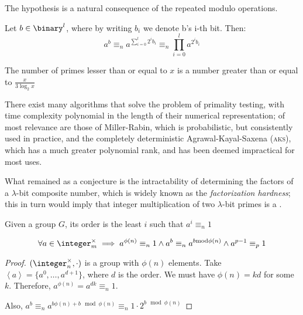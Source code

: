The hypothesis is a natural consequence of the repeated modulo operations.

\begin{observation}
    Let $b \in \binary^l$, where by writing $b_i$ we denote b's i-th bit. Then:
    \[
        a^b \equiv_n a^{\sum_{i = 0}^l 2^ib_i} \equiv_n \prod_{i = 0}^l a^{2^ib_i} 
    \]
\end{observation}

\begin{theorem}
    The number of primes lesser than or equal to $x$ is a number greater than or equal to $\frac{x}{3\log_2 x}$
\end{theorem}

There exist many algorithms that solve the problem of primality testing, with time complexity polynomial in the length of their numerical representation; of most relevance are those of Miller-Rabin, which is probabilistic, but consistently used in practice, and the completely deterministic Agrawal-Kayal-Saxena (\textsc{aks}), which has a much greater polynomial rank, and has been deemed impractical for most uses.

What remained as a conjecture is the intractability of determining the factors of a $\lambda$-bit composite number, which is widely known as the \emph{factorization hardness}; this in turn would imply that integer multiplication of two $\lambda$-bit primes is a \owf.

\begin{definition}
    Given a group $G$, its order is the least $i$ such that $a^i \equiv_n 1$ 
\end{definition}

\begin{corollary}
    \[
        \forall a \in \integer_m^\times \implies a^{\phi(n)} \equiv_n 1 \wedge a^b \equiv_n a^{b \mod \phi(n)} \wedge a^{p - 1} \equiv_p 1
    \]
\end{corollary}

\begin{proof}
    $(\integer_n^\times, \cdot)$ is a group with $\phi(n)$ elements. Take $\left< a \right> = \{a^0, \dots, a^{d + 1}\}$, where $d$ is the order. We must have $\phi(n) = kd$ for some $k$. Therefore, $a^{\phi(n)} = a^{dk} \equiv_n 1$.

    Also, $a^b \equiv_n a^{b\phi(n) + b \mod \phi(n)} \equiv_n 1 \cdot 2^{b \mod \phi(n)}$
\end{proof}

